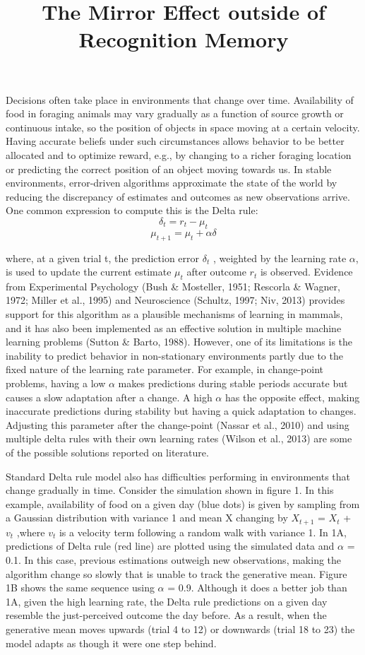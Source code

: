 \documentclass[jou,apacite]{apa6}
\title{The Mirror Effect outside of Recognition Memory}
\begin{document}
\maketitle    
Decisions often take place in environments that change over time. Availability of food in foraging animals may vary gradually as a function of source growth or continuous intake, so the position of objects in space moving at a certain velocity. Having accurate beliefs under such circumstances allows behavior to be better allocated and to optimize reward, e.g., by changing to a richer foraging location or predicting the correct position of an object moving towards us. In stable environments, error-driven algorithms approximate the state of the world by reducing the discrepancy of estimates and outcomes as new observations arrive. One common expression to compute this is the Delta rule: $$\delta_t = r_t - \mu_t$$
\begin{equation}
\mu_{t+1} = \mu_t + \alpha\delta
\end{equation}

where, at a given trial t, the prediction error $\delta_t$ , weighted by the learning rate $\alpha$, is used to update the current estimate $\mu_t$ after outcome $r_t$  is observed. Evidence from Experimental Psychology (Bush \& Mosteller, 1951; Rescorla \& Wagner, 1972; Miller et al., 1995) and Neuroscience (Schultz, 1997; Niv, 2013) provides support for this algorithm as a plausible mechanisms of learning in mammals, and it has also been implemented as an effective solution in multiple machine learning problems (Sutton \& Barto, 1988). However, one of its limitations is the inability to predict behavior in non-stationary environments partly due to the fixed nature of the learning rate parameter. For example, in change-point problems, having a low $\alpha$ makes predictions during stable periods accurate but causes a slow adaptation after a change. A high $\alpha$ has the opposite effect, making inaccurate predictions during stability but having a quick adaptation to changes. Adjusting this parameter after the change-point (Nassar et al., 2010) and using multiple delta rules with their own learning rates (Wilson et al., 2013) are some of the possible solutions reported on literature.  

Standard Delta rule model also has difficulties performing in environments that change gradually in time.  Consider the simulation shown in figure 1.  In this example, availability of food on a given day (blue dots) is given by sampling from a Gaussian distribution with variance 1 and mean X changing by $X_{t+1}$ = $X_t$ + $v_t$ ,where $v_t$  is a velocity term following a random walk with variance 1. In 1A, predictions of Delta rule (red line) are plotted using the simulated data and $\alpha$ = 0.1. In this case, previous estimations outweigh new observations, making the algorithm change so slowly that is unable to track the generative mean. Figure 1B shows the same sequence using $\alpha$ = 0.9. Although it does a better job than 1A, given the high learning rate, the Delta rule predictions on a given day resemble the just-perceived outcome the day before. As a result, when the generative mean moves upwards (trial 4 to 12) or downwards (trial 18 to 23) the model adapts as though it were one step behind. 
\end{document}
